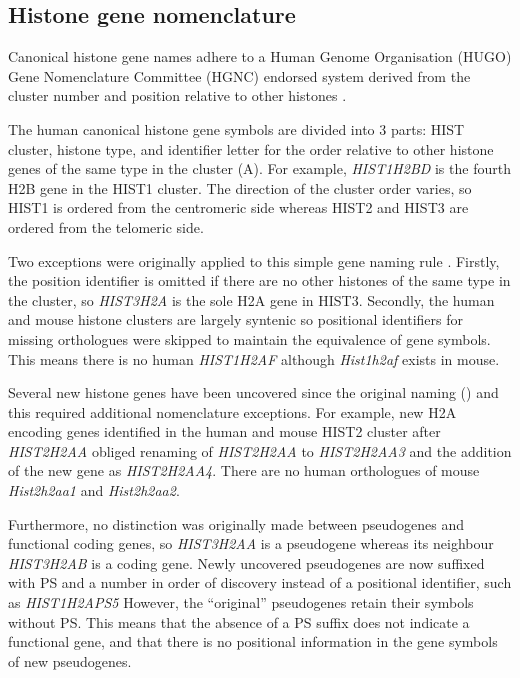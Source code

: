  \subsection{Histone gene nomenclature}
    Canonical histone gene names adhere to a Human Genome Organisation (HUGO) Gene Nomenclature Committee (HGNC) 
	endorsed system derived from the cluster number and position relative to other histones \citep{Marzluff02}.

	The human canonical histone gene symbols are divided into 3 parts: 
	HIST cluster, histone type, and identifier letter
	for the order relative to other histone genes of the same type in the cluster (A).
	For example, \textit{HIST1H2BD} is the fourth H2B gene in the HIST1 cluster.
	The direction of the cluster order varies, so HIST1 is ordered from the centromeric side 
	whereas HIST2 and HIST3 are ordered from the telomeric side.
	
    Two exceptions were originally applied to this simple gene naming rule \citep{Marzluff02}. 
	Firstly, the position identifier is omitted if there are no other histones of the same type in the cluster, 
	so \textit{HIST3H2A} is the sole H2A gene in HIST3. 
	Secondly, the human and mouse histone clusters are largely syntenic 
	so positional identifiers for missing orthologues were skipped to maintain the equivalence of gene symbols.
	This means there is no human \textit{HIST1H2AF} although \textit{Hist1h2af} exists in mouse.

	Several new histone genes have been uncovered since the original naming () 
	and this required additional nomenclature exceptions.
	For example, new H2A encoding genes identified in the human and mouse HIST2 cluster after \textit{HIST2H2AA} 
	obliged renaming of \textit{HIST2H2AA} to \textit{HIST2H2AA3} and the addition of the new gene as \textit{HIST2H2AA4}. 
	There are no human orthologues of mouse \textit{Hist2h2aa1} and \textit{Hist2h2aa2}.
	
	Furthermore, no distinction was originally made between pseudogenes and functional coding genes, 
	so \textit{HIST3H2AA} is a pseudogene whereas its neighbour \textit{HIST3H2AB} is a coding gene.
	Newly uncovered pseudogenes are now suffixed with PS and a number in order of discovery 
	instead of a positional identifier, such as \textit{HIST1H2APS5} 
	However, the ``original'' pseudogenes retain their symbols without PS. 
	This means that the absence of a PS suffix does not indicate a functional gene, 
	and that there is no positional information in the gene symbols of new pseudogenes.

